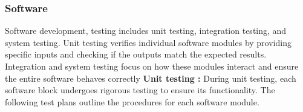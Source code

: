 \documentclass[a4paper,12pt]{article}
\begin{document}
	\subsubsection{Software }
	Software development, testing includes unit testing, integration testing, and system testing. Unit testing verifies individual software modules by providing specific inputs and checking if the outputs match the expected results. Integration and system testing focus on how these modules interact and ensure the entire software behaves correctly
	\newline
	\textbf{Unit testing :} \newline
	During unit testing, each software block undergoes rigorous testing to ensure its functionality. The following test plans outline the procedures for each software module.
	\\
\end{document}
